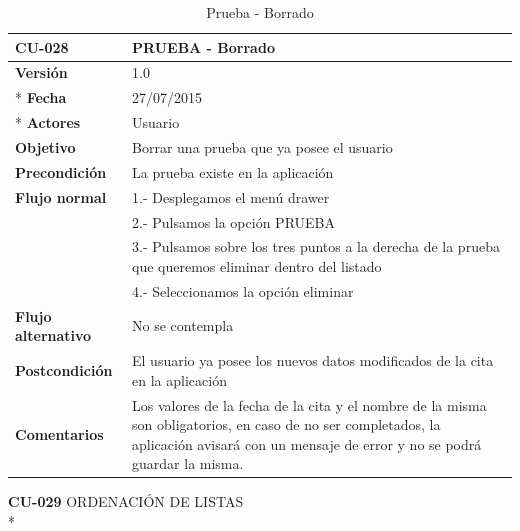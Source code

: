 \documentclass[../pfc.tex]{subfiles}
\begin{document}
	\begin{table}[H]
		\centering
		\begin{tabular}[t]{|p{3cm}|p{9.5cm}|}
			\hline \textbf{CU-028} & \textbf{PRUEBA - Borrado} \\*
			\hline\hline \textbf{Versión} & 1.0 \\ *
			\hline\hline \textbf{Fecha} & 27/07/2015 \\ *
			\hline\textbf{Actores} 	& Usuario\\*
			\hline \textbf{Objetivo} & Borrar una prueba que ya posee el usuario\\* 			
			\hline \textbf{Precondición} & La prueba existe en la aplicación\\* 
			\hline \textbf{Flujo normal} & 1.- Desplegamos el menú drawer \\* 
			& 2.- Pulsamos la opción PRUEBA\\*	
			& 3.- Pulsamos sobre los tres puntos a la derecha de la prueba que queremos eliminar dentro del listado\\*	
			& 4.- Seleccionamos la opción eliminar\\*	
			\hline \textbf{Flujo alternativo} & No se contempla \\* 
			\hline \textbf{Postcondición} & El usuario ya posee los nuevos datos modificados de la cita en la aplicación \\* 
			\hline \textbf{Comentarios}   & Los valores de la fecha de la cita y el nombre de la misma son obligatorios, en caso de no ser completados, la aplicación avisará con un mensaje de error y no se podrá guardar la misma.\\*
			\hline
		\end{tabular}
		\caption{Prueba - Borrado}
		\label{tabla:caso028}
	\end{table}

	
	
	\textbf{CU-029}	ORDENACIÓN DE LISTAS\\* 
	
\end{document}

